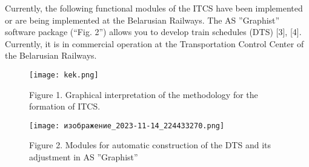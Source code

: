 \documentclass{article}
\begin{document}
\begin{multicols}{2}
\begin{itemize}[noitemsep]
\end{itemize}


 Currently, the following functional modules of the
ITCS have been implemented or are being implemented
at the Belarusian Railways. The AS ”Graphist” software
package (“Fig. 2”) allows you to develop train schedules
(DTS) [3], [4]. Currently, it is in commercial operation
at the Transportation Control Center of the Belarusian
Railways.
\end{multicols}


 \begin{figure}
     \centering
     \texttt{[image: kek.png]}
     
    Figure 1. Graphical interpretation of the methodology for the formation of ITCS.
     \end{figure}
     
          \begin{figure}
     \centering
     \texttt{[image: изображение\_2023-11-14\_224433270.png]}
     
         Figure 2. Modules for automatic construction of the DTS and its adjustment in AS ”Graphist”
         \end{figure}
 
\end{document}
